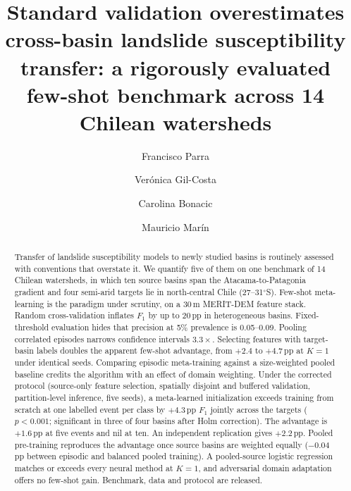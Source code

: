 \documentclass[preprint,12pt,3p,authoryear]{elsarticle}
\newcommand{\revtext}[1]{{\color{blue!70!black}#1}}
\begin{document}
\begin{frontmatter}

\title{Standard validation overestimates cross-basin landslide susceptibility transfer: a rigorously evaluated few-shot benchmark across 14 Chilean watersheds}

\author[usach]{Francisco Parra}

\author[unsl]{Verónica Gil-Costa}
\author[usach]{Carolina Bonacic}
\author[usach]{Mauricio Marín}



\begin{abstract}
\revtext{Transfer of landslide susceptibility models to newly studied basins is routinely assessed with conventions that overstate it. We quantify five of them on one benchmark of 14 Chilean watersheds, in which ten source basins span the Atacama-to-Patagonia gradient and four semi-arid targets lie in north-central Chile (27--31$^\circ$S). Few-shot meta-learning is the paradigm under scrutiny, on a 30\,m MERIT-DEM feature stack. Random cross-validation inflates $F_1$ by up to 20\,pp in heterogeneous basins. Fixed-threshold evaluation hides that precision at 5\% prevalence is 0.05--0.09. Pooling correlated episodes narrows confidence intervals $3.3\times$. Selecting features with target-basin labels doubles the apparent few-shot advantage, from $+2.4$ to $+4.7$\,pp at $K=1$ under identical seeds. Comparing episodic meta-training against a size-weighted pooled baseline credits the algorithm with an effect of domain weighting. Under the corrected protocol (source-only feature selection, spatially disjoint and buffered validation, partition-level inference, five seeds), a meta-learned initialization exceeds training from scratch at one labelled event per class by $+4.3$\,pp $F_1$ jointly across the targets ($p<0.001$; significant in three of four basins after Holm correction). The advantage is $+1.6$\,pp at five events and nil at ten. An independent replication gives $+2.2$\,pp. Pooled pre-training reproduces the advantage once source basins are weighted equally ($-0.04$\,pp between episodic and balanced pooled training). A pooled-source logistic regression matches or exceeds every neural method at $K=1$, and adversarial domain adaptation offers no few-shot gain. Benchmark, data and protocol are released.}
\end{abstract}


\end{frontmatter}
\end{document}
